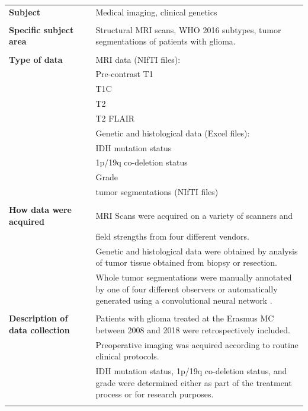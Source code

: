 \begin{table}[htbp]
\begin{tabular}{L{4cm}C{0.2cm}L{8cm}}
\toprule
\textbf{Subject} && Medical imaging, clinical genetics\\
\\
\textbf{Specific subject area}  && Structural \acrshort{MRI} scans, \acrshort{WHO} 2016 subtypes, \gls{tumor} segmentations of patients with glioma.\\
\\
\textbf{Type of data}  && \acrshort{MRI} data (NIfTI files):\\
&& \hphantom{aaaaa}Pre-contrast \acrlong{T1}\\
&& \hphantom{aaaaa}\Acrlong{T1C}\\
&& \hphantom{aaaaa}\acrlong{T2}\\
&& \hphantom{aaaaa}\acrlong{T2} FLAIR\\
&& Genetic and histological data (Excel files):\\
&&\hphantom{aaaaa}\acrshort{IDH} mutation status\\
&&\hphantom{aaaaa}1p/19q co-deletion status\\
&&\hphantom{aaaaa}Grade\\
&&\Gls{tumor} segmentations (NIfTI files)\\
\\
\textbf{How data were acquired} && \acrshort{MRI} Scans were acquired on a variety of scanners and\\
&& field strengths from four different vendors.\\
&& Genetic and histological data were obtained by analysis of \gls{tumor} tissue obtained from biopsy or resection.\\
&& Whole \gls{tumor} segmentations were manually annotated by one of four different observers or automatically generated using a convolutional neural network \autocite{voortunpublishedsubtypingEGD}.\\
\\
\textbf{Description of data collection} && Patients with glioma treated at the Erasmus MC between 2008 and 2018 were retrospectively included.\\
&&Preoperative imaging was acquired according to routine clinical protocols.\\
&&\acrshort{IDH} mutation status, 1p/19q co-deletion status, and grade were determined either as part of the treatment process or for research purposes.\\
\\

\end{tabular}
\end{table}
